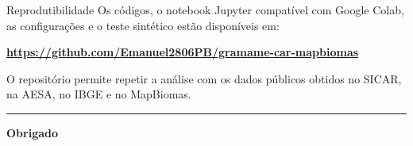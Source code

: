 \documentclass[aspectratio=169,10pt]{beamer}
\begin{document}
\begin{frame}{Reprodutibilidade}
  \vspace{0.25cm}
  Os códigos, o notebook Jupyter compatível com Google Colab, as configurações e o teste sintético estão disponíveis em:

  \vspace{0.35cm}
  \begin{center}
    {\large\bfseries\color{AzulMedio}\url{https://github.com/Emanuel2806PB/gramame-car-mapbiomas}}
  \end{center}

  \vspace{0.45cm}
  O repositório permite repetir a análise com os dados públicos obtidos no SICAR, na AESA, no IBGE e no MapBiomas.

  \vspace{0.55cm}
  {\color{AzulMedio}\rule{\textwidth}{1pt}}\par
  \vspace{0.35cm}
  {\centering\Large\bfseries Obrigado\par}
\end{frame}
\end{document}
